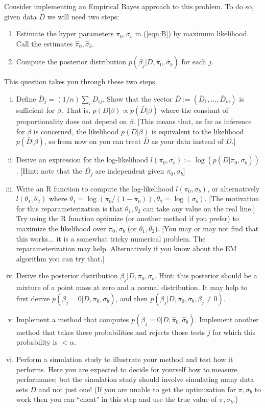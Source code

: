 \documentclass[12pt]{article}
\begin{document}
\begin{enumerate}
Consider implementing an Empirical Bayes approach to this problem. To do so, given data $D$ we will need two steps:
\begin{enumerate}[A]
\item Estimate the hyper parameters $\pi_0,\sigma_b$ in (\ref{eqn:B}) by maximum likelihood. Call the estimates $\hat\pi_0, \hat\sigma_b$.
\item Compute the posterior distribution $p(\beta_j | D, \hat\pi_0,\hat\sigma_b)$ for each $j$.
\end{enumerate}
This question takes you through these two steps.
\begin{enumerate}[i)]
\item Define $\bar{D}_j = (1/n) \sum_i D_{ij}$. Show that the vector $\bar{D}:=(\bar{D}_1,\dots,\bar{D}_m)$ is sufficient for $\beta$. 
That is, $p(D|\beta) \propto p(\bar{D} | \beta)$ where the constant of proportionality does not depend on $\beta$. [This means that,
as far as inference for $\beta$ is concerned,  the likelihood $p(D| \beta)$ is equivalent to the likelihood $p(\bar{D} | \beta)$, so from now on you can treat $\bar{D}$ as
your data instead of $D$.] 
\item Derive an expression for the log-likelihood $l(\pi_0,\sigma_b) :=\log(p(\bar{D} | \pi_0,\sigma_b))$. [Hint: note that the $\bar{D_j}$ are independent given $\pi_0,\sigma_b$]
\item Write an R function to compute the log-likelihood $l(\pi_0,\sigma_b)$, or alternatively $l(\theta_1,\theta_2)$ where 
$\theta_1 = \log(\pi_0/(1-\pi_0)), \theta_2 = \log(\sigma_b)$. [The motivation for this reparameterization is that $\theta_1,\theta_2$ can take
any value on the real line.] Try using the R function optimize (or another method if you prefer)
to maximize the likelihood over $\pi_0,\sigma_b$ (or $\theta_1,\theta_2$).
[You may or may not find that this works... it is a somewhat tricky numerical problem. The reparameterization may help. Alternatively if you know about the EM algorithm
you can try that.]
\item Derive the posterior distribution $\beta_j | D,\pi_0,\sigma_b$. Hint: this posterior should be a mixture of a point mass at zero and a normal distribution. 
It may help to first derive $p(\beta_j = 0 | D, \pi_0, \sigma_b)$, and then $p(\beta_j | D, \pi_0,\sigma_b, \beta_j \neq 0)$.
\item Implement a method that computes $p(\beta_j = 0 | D, \hat\pi_0, \hat\sigma_b)$. Implement another method that takes these probabilities and rejects those tests $j$ for which this probability is $<\alpha$. 
\item Perform a simulation study to illustrate your method and test how it performs.  Here you are expected to decide for yourself how to measure performance; but
the simulation study should involve simulating many data sets $D$ and not just one!
(If you are unable to get the optimization for $\pi,\sigma_b$ to work then
you can ``cheat" in this step and use the true value of $\pi,\sigma_b$.)
\end{enumerate}




\end{enumerate}
\end{document}

